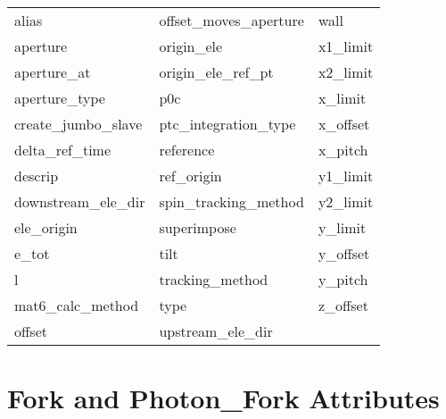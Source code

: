  \begin{tabular}{lll} \toprule
alias                       & offset_moves_aperture       & wall                        \\
aperture                    & origin_ele                  & x1_limit                    \\
aperture_at                 & origin_ele_ref_pt           & x2_limit                    \\
aperture_type               & p0c                         & x_limit                     \\
create_jumbo_slave          & ptc_integration_type        & x_offset                    \\
delta_ref_time              & reference                   & x_pitch                     \\
descrip                     & ref_origin                  & y1_limit                    \\
downstream_ele_dir          & spin_tracking_method        & y2_limit                    \\
ele_origin                  & superimpose                 & y_limit                     \\
e_tot                       & tilt                        & y_offset                    \\
l                           & tracking_method             & y_pitch                     \\
mat6_calc_method            & type                        & z_offset                    \\
offset                      & upstream_ele_dir            &                             \\
 \bottomrule
 \end{tabular}
 \vfill
 
 \section{Fork and Photon_Fork Attributes}
 \label{s:list.fork}
 
